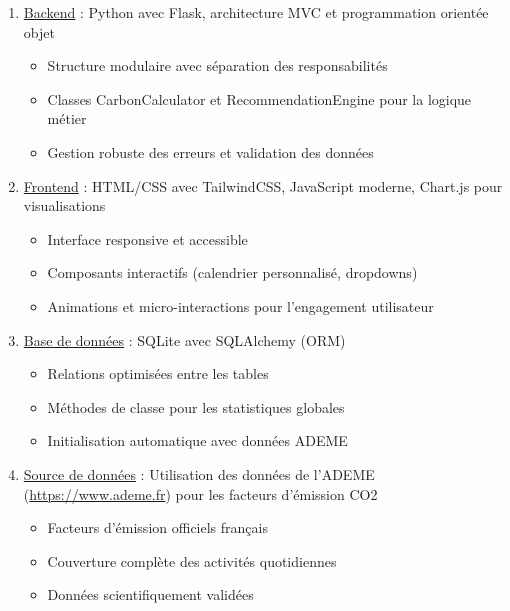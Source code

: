 \documentclass[a4paper,11pt]{article}
\begin{document}
    \begin{enumerate}
        \item \underline{Backend} : Python avec Flask, architecture MVC et programmation orientée objet
            \begin{itemize}
                \item Structure modulaire avec séparation des responsabilités
                \item Classes CarbonCalculator et RecommendationEngine pour la logique métier
                \item Gestion robuste des erreurs et validation des données
            \end{itemize}
            
        \item \underline{Frontend} : HTML/CSS avec TailwindCSS, JavaScript moderne, Chart.js pour visualisations
            \begin{itemize}
                \item Interface responsive et accessible
                \item Composants interactifs (calendrier personnalisé, dropdowns)
                \item Animations et micro-interactions pour l'engagement utilisateur
            \end{itemize}
            
        \item \underline{Base de données} : SQLite avec SQLAlchemy (ORM)
            \begin{itemize}
                \item Relations optimisées entre les tables
                \item Méthodes de classe pour les statistiques globales
                \item Initialisation automatique avec données ADEME
            \end{itemize}
            
        \item \underline{Source de données} : Utilisation des données de l'ADEME (\url{https://www.ademe.fr}) pour les facteurs d'émission CO2
            \begin{itemize}
                \item Facteurs d'émission officiels français
                \item Couverture complète des activités quotidiennes
                \item Données scientifiquement validées
            \end{itemize}
    \end{enumerate}
\end{document}
